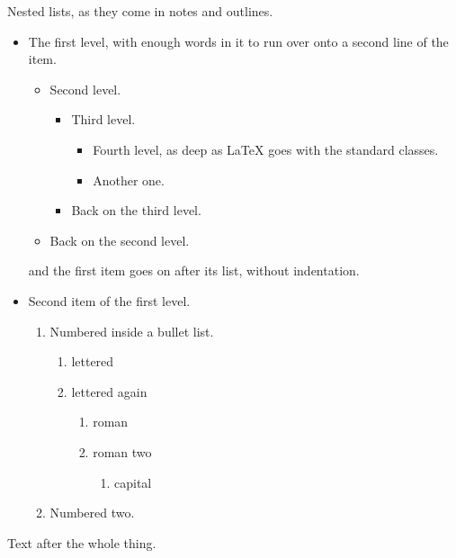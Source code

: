 \documentclass{article}
\begin{document}
Nested lists, as they come in notes and outlines.
\begin{itemize}
\item The first level, with enough words in it to run over onto a second line of the item.
  \begin{itemize}
  \item Second level.
    \begin{itemize}
    \item Third level.
      \begin{itemize}
      \item Fourth level, as deep as LaTeX goes with the standard classes.
      \item Another one.
      \end{itemize}
    \item Back on the third level.
    \end{itemize}
  \item Back on the second level.
  \end{itemize}
  and the first item goes on after its list, without indentation.
\item Second item of the first level.
  \begin{enumerate}
  \item Numbered inside a bullet list.
    \begin{enumerate}
    \item lettered
    \item lettered again
      \begin{enumerate}
      \item roman
      \item roman two
        \begin{enumerate}
        \item capital
        \end{enumerate}
      \end{enumerate}
    \end{enumerate}
  \item Numbered two.
  \end{enumerate}
\end{itemize}
Text after the whole thing.
\end{document}
